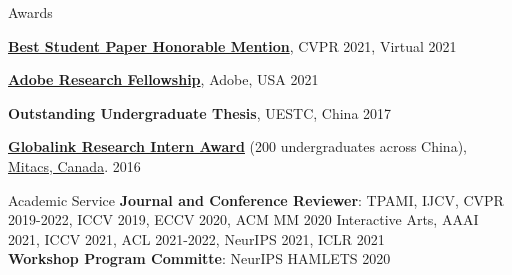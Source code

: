\documentclass{resume} %
\begin{document}

\begin{rSection}{Awards}
\item {\textbf{\href{http://cvpr2021.thecvf.com/node/329}{Best Student Paper Honorable Mention}}, CVPR 2021, Virtual } \hfill {2021}    
\item {\textbf{\href{https://research.adobe.com/fellowship/}{Adobe Research Fellowship}}, Adobe, USA} \hfill {2021}    
\item {\textbf{Outstanding Undergraduate Thesis}, UESTC, China} \hfill {2017} 
\item {\textbf{\href{https://www.mitacs.ca/en/programs/globalink/globalink-research-internship}{Globalink Research Intern Award}} (200 undergraduates across China), \href{https://www.mitacs.ca/en}{Mitacs, Canada}. } \hfill {2016}
\end{rSection}




\begin{rSection}{Academic Service}
    \textbf{Journal and Conference Reviewer}: TPAMI, IJCV, CVPR 2019-2022, ICCV 2019, ECCV 2020, ACM MM 2020 Interactive Arts, AAAI 2021, ICCV 2021, ACL 2021-2022, NeurIPS 2021, ICLR 2021 \\
    \textbf{Workshop Program Committe}: NeurIPS HAMLETS 2020
    
\end{rSection}



    
\end{document}
